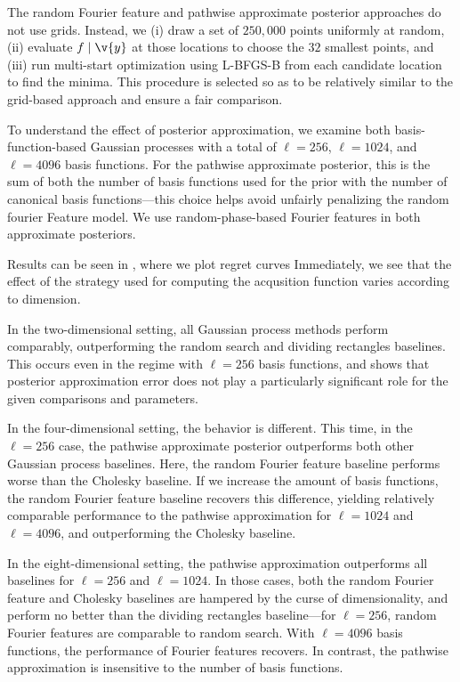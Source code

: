 \documentclass[11pt]{book}
\begin{document}
The random Fourier feature and pathwise approximate posterior approaches do not use grids.
Instead, we (i) draw a set of $250,000$ points uniformly at random, (ii) evaluate $f \given \v{y}$ at those locations to choose the $32$ smallest points, and (iii) run multi-start optimization using L-BFGS-B \cite{byrd95} from each candidate location to find the minima.
This procedure is selected so as to be relatively similar to the grid-based approach and ensure a fair comparison.


To understand the effect of posterior approximation, we examine both basis-function-based Gaussian processes with a total of $\ell = 256$, $\ell = 1024$, and $\ell = 4096$ basis functions.
For the pathwise approximate posterior, this is the sum of both the number of basis functions used for the prior with the number of canonical basis functions---this choice helps avoid unfairly penalizing the random fourier Feature model.
We use random-phase-based Fourier features in both approximate posteriors.

Results can be seen in , where we plot regret curves 
Immediately, we see that the effect of the strategy used for computing the acqusition function varies according to dimension.

In the two-dimensional setting, all Gaussian process methods perform comparably, outperforming the random search and dividing rectangles baselines.
This occurs even in the regime with $\ell = 256$ basis functions, and shows that posterior approximation error does not play a particularly significant role for the given comparisons and parameters.

In the four-dimensional setting, the behavior is different.
This time, in the $\ell = 256$ case, the pathwise approximate posterior outperforms both other Gaussian process baselines.
Here, the random Fourier feature baseline performs worse than the Cholesky baseline.
If we increase the amount of basis functions, the random Fourier feature baseline recovers this difference, yielding relatively comparable performance to the pathwise approximation for $\ell = 1024$ and $\ell = 4096$, and outperforming the Cholesky baseline.

In the eight-dimensional setting, the pathwise approximation outperforms all baselines for $\ell = 256$ and $\ell = 1024$.
In those cases, both the random Fourier feature and Cholesky baselines are hampered by the curse of dimensionality, and perform no better than the dividing rectangles baseline---for $\ell = 256$, random Fourier features are comparable to random search.
With $\ell = 4096$ basis functions, the performance of Fourier features recovers.
In contrast, the pathwise approximation is insensitive to the number of basis functions.
\end{document}
